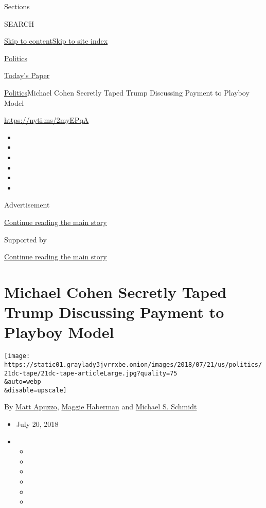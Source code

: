 Sections

SEARCH

\protect\hyperlink{site-content}{Skip to
content}\protect\hyperlink{site-index}{Skip to site index}

\href{https://www.nytimes3xbfgragh.onion/section/politics}{Politics}

\href{https://myaccount.nytimes3xbfgragh.onion/auth/login?response_type=cookie\&client_id=vi}{}

\href{https://www.nytimes3xbfgragh.onion/section/todayspaper}{Today's
Paper}

\href{/section/politics}{Politics}\textbar{}Michael Cohen Secretly Taped
Trump Discussing Payment to Playboy Model

\url{https://nyti.ms/2myEPqA}

\begin{itemize}
\item
\item
\item
\item
\item
\item
\end{itemize}

Advertisement

\protect\hyperlink{after-top}{Continue reading the main story}

Supported by

\protect\hyperlink{after-sponsor}{Continue reading the main story}

\hypertarget{michael-cohen-secretly-taped-trump-discussing-payment-to-playboy-model}{%
\section{Michael Cohen Secretly Taped Trump Discussing Payment to
Playboy
Model}\label{michael-cohen-secretly-taped-trump-discussing-payment-to-playboy-model}}

\texttt{[image: https://static01.graylady3jvrrxbe.onion/images/2018/07/21/us/politics/21dc-tape/21dc-tape-articleLarge.jpg?quality=75\\\&auto=webp\\\&disable=upscale]}

By \href{http://www.nytimes3xbfgragh.onion/by/matt-apuzzo}{Matt Apuzzo},
\href{http://www.nytimes3xbfgragh.onion/by/maggie-haberman}{Maggie
Haberman} and
\href{http://www.nytimes3xbfgragh.onion/by/michael-s-schmidt}{Michael S.
Schmidt}

\begin{itemize}
\item
  July 20, 2018
\item
  \begin{itemize}
  \item
  \item
  \item
  \item
  \item
  \item
  \end{itemize}
\end{itemize}

